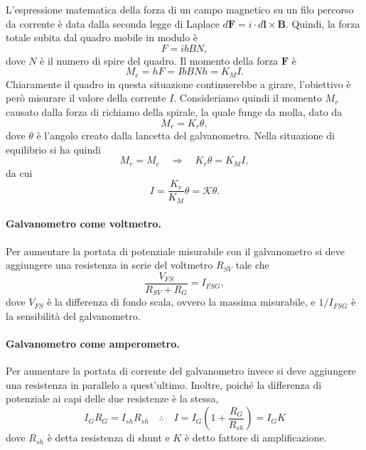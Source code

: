 L'espressione matematica della forza di un campo magnetico su un filo percorso da corrente è data dalla seconda legge di Laplace $d\bm{F}=i\cdot d\bm{l}\times \bm{B}$. Quindi, la forza totale subita dal quadro mobile in modulo è 
\begin{equation}
    F=ibBN,
\end{equation}
dove $N$ è il numero di spire del quadro. Il momento della forza $\bm{F}$ è
\begin{equation}
    M_e=hF=IbBNh=K_MI.
\end{equation}
Chiaramente il quadro in questa situazione continuerebbe a girare, l'obiettivo è però misurare il valore della corrente $I$. Consideriamo quindi il momento $M_r$ causato dalla forza di richiamo della spirale, la quale funge da molla, dato da
\begin{equation}
    M_r=K_r\theta,
\end{equation}
dove $\theta$ è l'angolo creato dalla lancetta del galvanometro. Nella situazione di equilibrio si ha quindi 
\begin{equation}
    M_r=M_e\quad\Rightarrow\quad K_r\theta=K_MI,
\end{equation}
da cui
\begin{equation}
    \label{eq: corrente galvanometro}
    I=\frac{K_r}{K_M}\theta=\mathcal{K}\theta.
\end{equation}

\paragraph{Galvanometro come voltmetro.} Per aumentare la portata di potenziale misurabile con il galvanometro si deve aggiungere una resistenza in serie del voltmetro $R_{SV}$ tale che
\begin{equation}
    \frac{V_{FS}}{R_{SV}+R_G}=I_{FSG},
\end{equation}
dove $V_{FS}$ è la differenza di fondo scala, ovvero la massima misurabile, e $1/I_{FSG}$ è la sensibilità del galvanometro.

\paragraph{Galvanometro come amperometro.} Per aumentare la portata di corrente del galvanometro invece si deve aggiungere una resistenza in parallelo a quest'ultimo. Inoltre, poiché la differenza di potenziale ai capi delle due resistenze è la stessa,
\begin{equation}
    I_GR_G=I_{sh}R_{sh}\quad\therefore\quad I=I_G\left(1+\frac{R_G}{R_{sh}}\right)=I_GK
\end{equation}
dove $R_{sh}$ è detta resistenza di shunt e $K$ è detto fattore di amplificazione.

